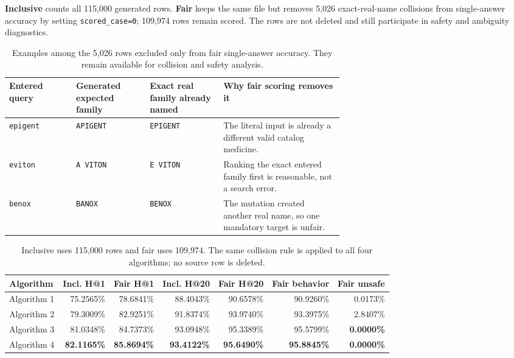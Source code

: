 \documentclass[11pt,a4paper]{article}
\newcommand{\code}[1]{\texttt{#1}}
\begin{document}
\textbf{Inclusive} counts all 115,000 generated rows. \textbf{Fair} keeps the
same file but removes 5,026 exact-real-name collisions from single-answer
accuracy by setting \code{scored\_case=0}; 109,974 rows remain scored. The rows
are not deleted and still participate in safety and ambiguity diagnostics.

\begin{table}[H]
\centering
\small
\begin{tabularx}{\linewidth}{@{}L{0.20\linewidth}L{0.22\linewidth}L{0.22\linewidth}Y@{}}
\toprule
\textbf{Entered query} & \textbf{Generated expected family} &
\textbf{Exact real family already named} & \textbf{Why fair scoring removes it} \\
\midrule
\code{epigent} & \code{APIGENT} & \code{EPIGENT} & The literal input is already a different valid catalog medicine. \\
\code{eviton} & \code{A VITON} & \code{E VITON} & Ranking the exact entered family first is reasonable, not a search error. \\
\code{benox} & \code{BANOX} & \code{BENOX} & The mutation created another real name, so one mandatory target is unfair. \\
\bottomrule
\end{tabularx}
\caption{Examples among the 5,026 rows excluded only from fair single-answer
accuracy. They remain available for collision and safety analysis.}
\end{table}

\begin{table}[H]
\centering
\small
\setlength{\tabcolsep}{6pt}
\begin{tabular}{@{}lrrrrrr@{}}
\toprule
\textbf{Algorithm} & \textbf{Incl. H@1} & \textbf{Fair H@1} &
\textbf{Incl. H@20} & \textbf{Fair H@20} & \textbf{Fair behavior} &
\textbf{Fair unsafe} \\
\midrule
Algorithm 1 & 75.2565\% & 78.6841\% & 88.4043\% & 90.6578\% & 90.9260\% & 0.0173\% \\
Algorithm 2 & 79.3009\% & 82.9251\% & 91.8374\% & 93.9740\% & 93.3975\% & 2.8407\% \\
Algorithm 3 & 81.0348\% & 84.7373\% & 93.0948\% & 95.3389\% & 95.5799\% & \textbf{0.0000\%} \\
Algorithm 4 & \textbf{82.1165\%} & \textbf{85.8694\%} & \textbf{93.4122\%} & \textbf{95.6490\%} & \textbf{95.8845\%} & \textbf{0.0000\%} \\
\bottomrule
\end{tabular}
\caption{Inclusive uses 115,000 rows and fair uses 109,974. The same
collision rule is applied to all four algorithms; no source row is deleted.}
\end{table}
\end{document}
